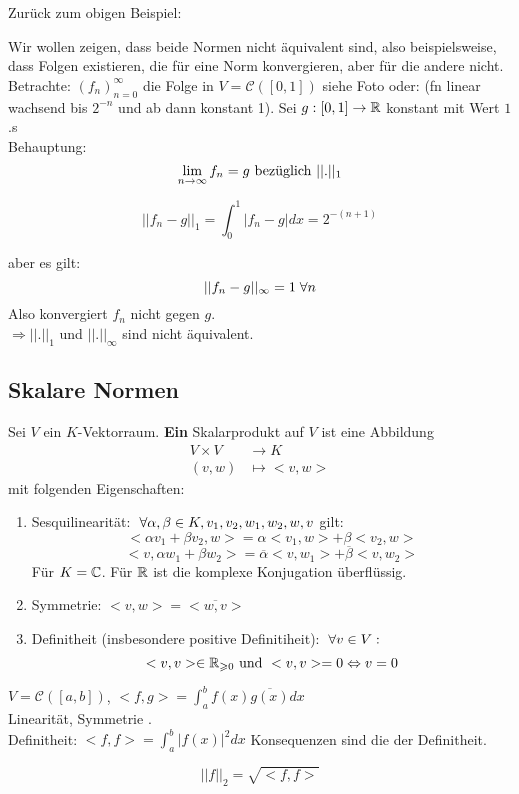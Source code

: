 \documentclass[main.tex]{subfiles}
\begin{document}
Zurück zum obigen Beispiel:
\begin{Beispiel}
  Wir wollen zeigen, dass beide Normen nicht äquivalent sind, also beispielsweise, dass Folgen existieren, die für eine Norm konvergieren, aber für die andere nicht.\\
  Betrachte: $(f_n)_{n=0}^\infty$ die Folge in $V = \mathcal{C}([0,1])$ siehe Foto oder: (fn linear wachsend bis $2^{-n}$ und ab dann konstant 1). Sei $g:[0,1] \to \mathbb{R}$ konstant mit Wert $1$.s\\
  Behauptung:
  $$\lim \limits_{n \to \infty} f_n = g \text{ bezüglich } ||.||_1$$
  \begin{Beweis}
    $$||f_n - g||_1 = \int_0^1 |f_n - g| dx = 2^{-(n+1)}$$
  \end{Beweis}
  aber es gilt:
  $$||f_n - g||_\infty = 1 \;\forall n$$
  Also konvergiert $f_n$ nicht gegen $g$.\\
  $\Rightarrow ||.||_1$ und $||.||_\infty$ sind nicht äquivalent.
\end{Beispiel}

\subsection{Skalare Normen}

\begin{Definition}[Skalarprodukt]
  Sei $V$ ein $K$-Vektorraum. \textbf{Ein} Skalarprodukt auf $V$ ist eine Abbildung
  $$\begin{aligned}
    V \times V &\to K \\
    (v,w) &\mapsto <v,w>
  \end{aligned}$$
  mit folgenden Eigenschaften:
  \begin{enumerate}
    \item Sesquilinearität: $\;\forall \alpha,\beta \in K, v_1,v_2,w_1,w_2,w,v$ gilt:
      $$<\alpha v_1 + \beta v_2 , w> = \alpha<v_1,w> + \beta<v_2,w>$$
      $$<v,\alpha w_1 + \beta w_2> = \overline{\alpha}<v,w_1> + \overline{\beta}<v,w_2>$$
      Für $K = \mathbb{C}$. Für $\mathbb{R}$ ist die komplexe Konjugation überflüssig.
    \item Symmetrie: $<v,w> = \overline{<w,v>}$
    \item Definitheit (insbesondere positive Definitiheit): $\;\forall v \in V:$
      $$<v,v> \in \mathbb{R}_{\geqslant 0} \text{ und } <v,v> = 0 \Leftrightarrow v = 0$$
  \end{enumerate}
\end{Definition}

\begin{Beispiel}
  $V= \mathcal{C}([a,b])$, $<f,g> = \int_a^b f(x)\overline{g(x)} dx$\\
  Linearität, Symmetrie \checkmark.\\
  Definitheit: $<f,f> = \int_a^b|f(x)|^2 dx$ Konsequenzen sind die der Definitheit.\\
  \begin{Theorem}
    $$||f||_2 = \sqrt{<f,f>}$$
  \end{Theorem}
\end{Beispiel}
\end{document}
